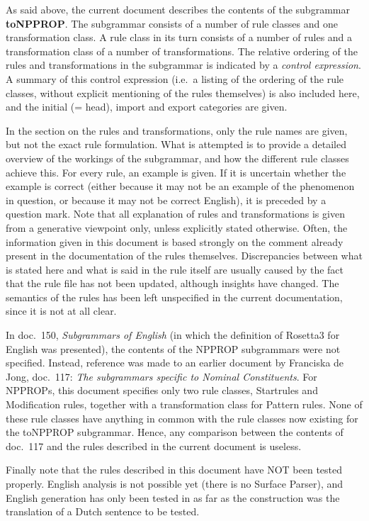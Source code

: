 As said above, the current document describes the contents of the subgrammar {
\bf toNPPROP}. The subgrammar consists of 
a number of rule classes and one transformation class. A rule class in its turn
consists of a number of rules and a transformation class of a number of 
transformations. The relative ordering of the rules and transformations in the
subgrammar is indicated by a {\em control expression}. A summary of this
control expression (i.e.\ a listing of the ordering of the rule classes, 
without explicit mentioning of the rules themselves) is also included here, 
and the initial (= head), import and export categories are given. 

In the section on the rules and transformations, only the rule names are given, 
but not the exact rule formulation. What is attempted 
is to provide a detailed overview of the workings of the subgrammar, and 
how the different rule classes achieve this. For every rule, an 
example is given. If it is uncertain whether the example is correct (either 
because it may not be an example of the phenomenon in question, or because it 
may not be correct English), it is preceded by a question mark. Note that all 
explanation of rules and transformations is given from a generative viewpoint
only, unless explicitly stated otherwise. Often, the information given in this 
document is based strongly on the comment already present in the documentation 
of the rules themselves. Discrepancies between what is stated here and what is 
said in the rule itself are usually caused by the fact that the rule file has 
not  been updated, although insights have changed. The semantics of the rules 
has been left unspecified in the current documentation, since it is not at all 
clear.

In doc.\ 150, {\em Subgrammars of English\/} (in which the definition of 
Rosetta3 for English was presented), the contents of the NPPROP subgrammars 
were not specified. Instead, reference was made to an earlier document by 
Franciska de Jong, doc.\ 117: {\em The subgrammars specific to Nominal 
Constituents\/}. For NPPROPs, this document specifies only two rule classes, 
Startrules and Modification rules, together with a transformation class for 
Pattern rules. None of these rule classes have anything in common with the rule 
classes now existing for the toNPPROP subgrammar. Hence, any comparison between 
the contents of doc.\ 117 and the rules described in the current document 
is useless.

Finally note that the rules described in this document have NOT been tested 
properly. English analysis is not possible yet (there is no Surface Parser), and 
English generation has only been tested in as far as the construction was the 
translation of a Dutch sentence to be tested.

